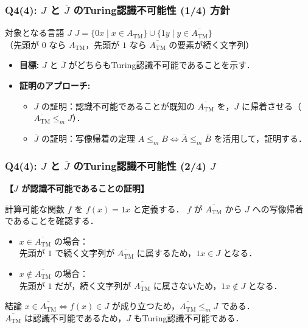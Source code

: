 \begin{frame}[fragile]
\frametitle{Q4(4): $J$ と $\overline{J}$ のTuring認識不可能性 (1/4) 方針}
\begin{block}{対象となる言語 $J$}
  $J = \{0x \mid x \in A_{\mathrm{TM}}\} \cup \{1y \mid y \in \overline{A_{\mathrm{TM}}}\}$ \\
  （先頭が $0$ なら $A_{\mathrm{TM}}$，先頭が $1$ なら $\overline{A_{\mathrm{TM}}}$ の要素が続く文字列）
\end{block}

\begin{itemize}
  \item \textbf{目標:} $J$ と $\overline{J}$ がどちらもTuring認識不可能であることを示す．
  \item \textbf{証明のアプローチ:} 
  \begin{itemize}
      \item $J$ の証明：認識不可能であることが既知の $\overline{A_{\mathrm{TM}}}$ を，$J$ に帰着させる（\alert{$\overline{A_{\mathrm{TM}}} \le_m J$}）．
      \item $\overline{J}$ の証明：写像帰着の定理 \alert{$A \le_m B \iff \overline{A} \le_m \overline{B}$} を活用して，証明する．
  \end{itemize}
\end{itemize}
\end{frame}

\begin{frame}[fragile]
\frametitle{Q4(4): $J$ と $\overline{J}$ のTuring認識不可能性 (2/4) $J$}

\textbf{【$J$ が認識不可能であることの証明】}

計算可能な関数 $f$ を $f(x) = 1x$ と定義する．
$f$ が $\overline{A_{\mathrm{TM}}}$ から $J$ への写像帰着であることを確認する．

\begin{itemize}
  \item $x \in \overline{A_{\mathrm{TM}}}$ の場合：\\
  先頭が $1$ で続く文字列が $\overline{A_{\mathrm{TM}}}$ に属するため，$1x \in J$ となる．
  \item $x \notin \overline{A_{\mathrm{TM}}}$ の場合：\\
  先頭が $1$ だが，続く文字列が $\overline{A_{\mathrm{TM}}}$ に属さないため，$1x \notin J$ となる．
\end{itemize}

\vspace{1em}
\begin{block}{結論}
  $x \in \overline{A_{\mathrm{TM}}} \iff f(x) \in J$ が成り立つため，$\overline{A_{\mathrm{TM}}} \le_m J$ である．\\
  $\overline{A_{\mathrm{TM}}}$ は認識不可能であるため，\alert{$J$ もTuring認識不可能}である．
\end{block}
\end{frame}


